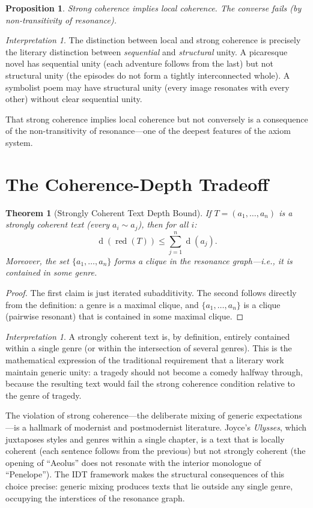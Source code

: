 \documentclass[11pt,openany]{book}
\theoremstyle{definition}
\theoremstyle{plain}
\newtheorem{theorem}[axiom]{Theorem}
\newtheorem{proposition}[axiom]{Proposition}
\theoremstyle{remark}
\newtheorem{interpretation}[axiom]{Interpretation}
\newcommand{\res}{\sim}                      %
\newcommand{\depth}{\operatorname{d}}       %
\begin{document}
\begin{proposition}
Strong coherence implies local coherence. The converse fails (by non-transitivity of resonance).
\end{proposition}

\begin{interpretation}
The distinction between local and strong coherence is precisely the literary distinction between \emph{sequential} and \emph{structural} unity. A picaresque novel has sequential unity (each adventure follows from the last) but not structural unity (the episodes do not form a tightly interconnected whole). A symbolist poem may have structural unity (every image resonates with every other) without clear sequential unity.

That strong coherence implies local coherence but not conversely is a consequence of the non-transitivity of resonance---one of the deepest features of the axiom system.
\end{interpretation}

\section{The Coherence-Depth Tradeoff}

\begin{theorem}[Strongly Coherent Text Depth Bound]
\label{thm:coherent-depth-bound}
If $T = (a_1, \ldots, a_n)$ is a strongly coherent text (every $a_i \res a_j$), then for all $i$:
\[
\depth(\operatorname{red}(T)) \leq \sum_{j=1}^n \depth(a_j).
\]
Moreover, the set $\{a_1, \ldots, a_n\}$ forms a clique in the resonance graph---i.e., it is contained in some genre.
\end{theorem}

\begin{proof}
The first claim is just iterated subadditivity. The second follows directly from the definition: a genre is a maximal clique, and $\{a_1, \ldots, a_n\}$ is a clique (pairwise resonant) that is contained in some maximal clique.
\end{proof}

\begin{interpretation}
A strongly coherent text is, by definition, entirely contained within a single genre (or within the intersection of several genres). This is the mathematical expression of the traditional requirement that a literary work maintain generic unity: a tragedy should not become a comedy halfway through, because the resulting text would fail the strong coherence condition relative to the genre of tragedy.

The violation of strong coherence---the deliberate mixing of generic expectations---is a hallmark of modernist and postmodernist literature. Joyce's \emph{Ulysses}, which juxtaposes styles and genres within a single chapter, is a text that is locally coherent (each sentence follows from the previous) but not strongly coherent (the opening of ``Aeolus'' does not resonate with the interior monologue of ``Penelope''). The IDT framework makes the structural consequences of this choice precise: generic mixing produces texts that lie outside any single genre, occupying the interstices of the resonance graph.
\end{interpretation}
\end{document}
